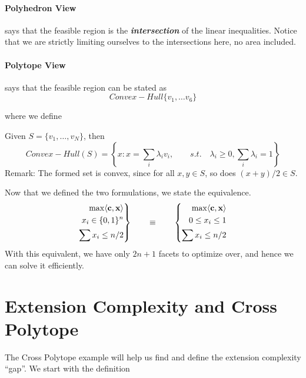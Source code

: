 \paragraph{Polyhedron View} says that the feasible region is the \textbf{\textit{intersection}} of the linear inequalities. Notice that we are strictly limiting ourselves to the intersections here, no area included. 

\paragraph{Polytope View} says that the feasible region can be stated as 
\begin{equation}
	Convex-Hull \{ v_1, \dots v_6 \}
\end{equation}

where we define 
\begin{definition}
	Given $S = \{v_1, \dots, v_N \}$, then
	\begin{equation}
		Convex-Hull(S) = \left\{ x: x = \sum_i \lambda_i v_i, \quad \quad s.t. \quad \lambda_i \geq 0, \sum_i \lambda_i = 1 \right\}
	\end{equation}
	Remark: The formed set is convex, since for all $x, y \in S$, so does $(x + y) / 2 \in S$. 
\end{definition}

Now that we defined the two formulations, we state the equivalence. 
\begin{equation}
	\left.\begin{aligned}
		\max \langle \mathbf{c}, \mathbf{x} \rangle \\
		x_i \in \{0, 1\}^n \\
		\sum x_i \leq n / 2
	\end{aligned} \right\}
	\quad \quad \equiv \quad \quad \left\{
	\begin{aligned}
		\max \langle \mathbf{c}, \mathbf{x} \rangle \\
		0 \leq x_i \leq 1 \\
		\sum x_i \leq n / 2
	\end{aligned} \right.
\end{equation}
With this equivalent, we have only $2n + 1$ facets to optimize over, and hence we can solve it efficiently. 


\section{Extension Complexity and Cross Polytope}
The Cross Polytope example will help us find and define the extension complexity ``gap''. We start with the definition

